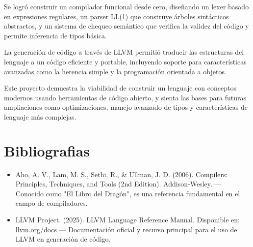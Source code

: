 \documentclass[a4paper,12pt]{article}
\begin{document}
Se logró construir un compilador funcional desde cero, diseñando un lexer basado en expresiones regulares, un parser LL(1) que construye árboles sintácticos abstractos, y un sistema de chequeo semántico que verifica la validez del código y permite inferencia de tipos básica.

La generación de código a través de LLVM permitió traducir las estructuras del lenguaje a un código eficiente y portable, incluyendo soporte para características avanzadas como la herencia simple y la programación orientada a objetos.

Este proyecto demuestra la viabilidad de construir un lenguaje con conceptos modernos usando herramientas de código abierto, y sienta las bases para futuras ampliaciones como optimizaciones, manejo avanzado de tipos y características de lenguaje más complejas.

\section{Bibliografias}
\begin{itemize}
	\item Aho, A. V., Lam, M. S., Sethi, R., \& Ullman, J. D. (2006). Compilers: Principles, Techniques, and Tools (2nd Edition). Addison-Wesley. — Conocido como "El Libro del Dragón", es una referencia fundamental en el campo de compiladores.
	\item  LLVM Project. (2025). LLVM Language Reference Manual. Disponible en:  \href{https://llvm.org/docs/LangRef.html}{llvm.org/docs}   — Documentación oficial y recurso principal para el uso de LLVM en generación de código.
\end{itemize}
\end{document}
